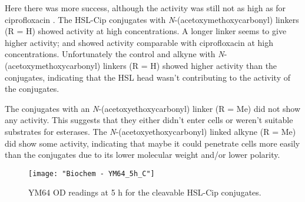 Here there was more success, although the activity was still not as high as for ciprofloxacin .
The HSL-Cip conjugates with \textit{N}-(acetoxymethoxycarbonyl) linkers (R = H) showed activity at high concentrations. A longer linker seems to give higher activity;  and  showed activity comparable with ciprofloxacin  at high concentrations.
Unfortunately the control  and alkyne  with \textit{N}-(acetoxymethoxycarbonyl) linkers (R = H) showed higher activity than the conjugates, indicating that the HSL head wasn't contributing to the activity of the conjugates.

The conjugates with an \textit{N}-(acetoxyethoxycarbonyl) linker (R = Me) did not show any activity. This suggests that they either didn't enter cells or weren't suitable substrates for esterases.
The \textit{N}-(acetoxyethoxycarbonyl) linked alkyne (R = Me) did show some activity, indicating that maybe it could penetrate cells more easily than the conjugates due to its lower molecular weight and/or lower polarity.

\begin{figure}[H]
	\begin{center}
		\texttt{[image: "Biochem - YM64\_5h\_C"]}
		\caption{YM64 OD readings at 5 h for the cleavable HSL-Cip conjugates.\label{fgr:YM64_5h_cleavable}}
	\end{center}
\end{figure}
